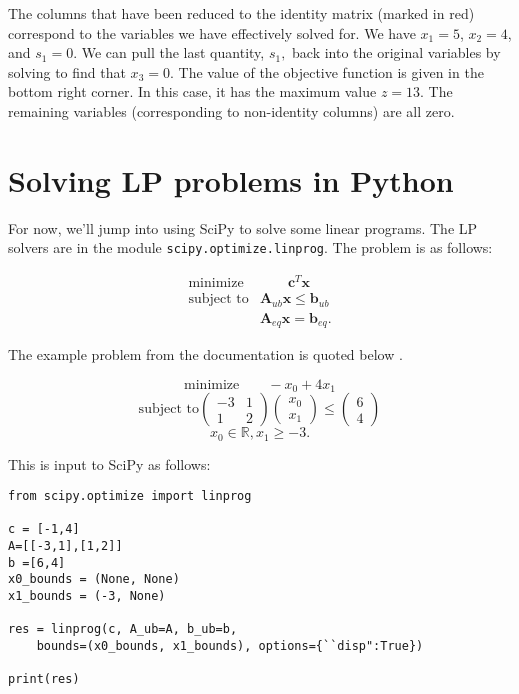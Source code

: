 \documentclass[12pt,english]{article}
\begin{document}
The columns that have been reduced to the identity matrix (marked in red) correspond to the variables we have effectively solved for.  We have $x_1 = 5$, $x_2 = 4$, and $s_1 = 0$.  We can pull the last quantity, $s_1,$ back into the original variables by solving to find that $x_3 = 0$.  The value of the objective function is given in the bottom right corner.  In this case, it has the maximum value $z = 13$.  The remaining variables (corresponding to non-identity columns) are all zero.

\section{Solving LP problems in Python}

For now, we'll jump into using SciPy to solve some linear programs.   The LP solvers are in the module \texttt{scipy.optimize.linprog}.   The problem is as follows:

$$
\begin{array}{lc}
\text{minimize} & \qquad \mathbf{c}^T \mathbf{x} \\
\text{subject to} 
& \mathbf{A}_{ub} \mathbf{x} \leq \mathbf{b}_{ub}  \\
& \mathbf{A}_{eq} \mathbf{x} = \mathbf{b}_{eq}.
\end{array}
$$

The example problem from the documentation is quoted below \cite{SciPy}.


$$
\text{minimize} \qquad -x_0 + 4x_1
$$
$$
\text{subject to}
\left(
\begin{array}{cc}
-3 & 1 \\
1 & 2 
\end{array}
\right)
\left(
\begin{array}{c}
x_0 \\
x_1
\end{array}
\right)
\leq 
\left(
\begin{array}{c}
6 \\
4
\end{array}
\right)
$$
$$
 x_0 \in \mathbb{R}, x_1 \geq -3.
$$

\noindent This is input to SciPy as follows:

\begin{lstlisting}
from scipy.optimize import linprog

c = [-1,4]
A=[[-3,1],[1,2]]
b =[6,4]
x0_bounds = (None, None)
x1_bounds = (-3, None)

res = linprog(c, A_ub=A, b_ub=b, 
	bounds=(x0_bounds, x1_bounds), options={``disp":True})
	
print(res)

\end{lstlisting}
\end{document}
